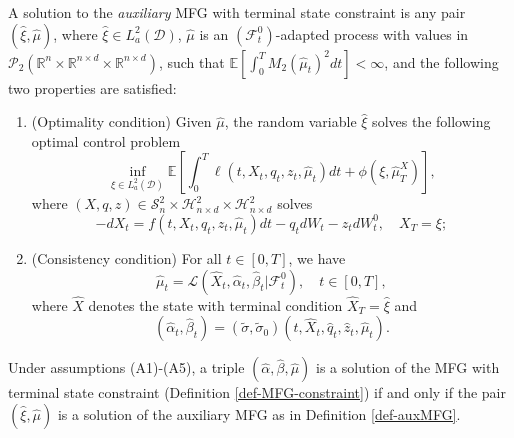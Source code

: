 \documentclass[10pt,a4paper]{amsart}
\begin{document}
\begin{defi} \label{def-auxMFG} A solution to the \emph{auxiliary} MFG with terminal state constraint is any pair $(\hat  \xi, \hat \mu)$, where $\hat \xi \in L^2 _a (\mathcal D)$, $\hat \mu$ is an $(\mathcal F_t ^0)$-adapted process with values in $\mathcal{P}_2(\mathbb{R}^n\times \mathbb{R}^{n\times d} \times \mathbb{R}^{n\times d})$, such that $\mathbb E \left[\int_0^T M_2(\hat \mu_t)^2 dt\right]<\infty$, and the following two properties are satisfied:
\begin{enumerate}
    \item (Optimality condition) Given $\hat \mu$, the random variable $\hat \xi$ solves the following optimal control problem
\begin{equation}
\label{auxoptimal}
     \inf_{\xi\in L^2 _a (\mathcal D)}\mathbb E \left[\int_0^T \ell(t, X_t, q_t, z_t, \hat \mu_t)dt+\phi(\xi, \hat\mu^X_T)\right],
\end{equation}
where $(X,q,z) \in \mathcal S^2_n \times  \mathcal H^2_{n \times d}\times \mathcal H^2_{n\times d}$ solves
\begin{equation}
-dX_t=f(t, X_t, q_t, z_t, \hat \mu_t)dt -q_tdW_t-z_tdW_t^0, \quad X_T=\xi;
\end{equation}
\item (Consistency condition)  For all $t\in [0,T]$, we have \[\hat \mu_t=\mathcal{L}(\hat X_t, \hat\alpha_t, \hat\beta_t |\mathcal{F}_t^0), \quad t\in [0,T], \] where $\hat X$ denotes the state with terminal condition $\hat X_T  = \hat \xi $ and
\begin{equation} (\hat \alpha_t , \hat \beta_t ) = (\tilde \sigma, \tilde \sigma_0)(t, \hat X_t , \hat q_t , \hat z_t , \hat \mu_t ). \label{eq:xi-to-alpha-beta}\end{equation}
\end{enumerate}
\end{defi}

\begin{prop} 
\label{equivalence}
Under assumptions (A1)-(A5), a triple $(\hat \alpha, \hat \beta, \hat \mu)$ is a solution of the MFG with terminal state constraint  (Definition \ref{def-MFG-constraint}) if and only if the pair $(\hat \xi, \hat \mu)$ is a solution of the auxiliary MFG as in Definition \ref{def-auxMFG}.
\end{prop}
\end{document}
